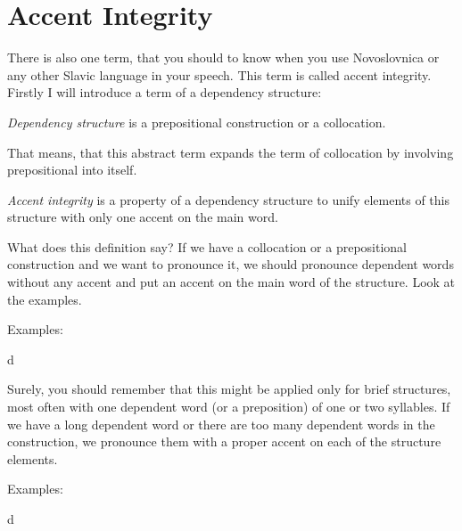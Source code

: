 \section{Accent Integrity}

There is also one term, that you should to know when you use Novoslovnica or any other Slavic language in your speech. This term is called accent integrity. Firstly I will introduce a term of a dependency structure:

\textit{Dependency structure} is a prepositional construction or a collocation.

That means, that this abstract term expands the term of collocation by involving prepositional into itself. 

\textit{Accent integrity} is a property of a dependency structure to unify elements of this structure with only one accent on the main word.

What does this definition say? If we have a collocation or a prepositional construction and we want to pronounce it, we should pronounce dependent words without any accent and put an accent on the main word of the structure. Look at the examples.

Examples:


d

Surely, you should remember that this might be applied only for brief structures, most often with one dependent word (or a preposition) of one or two syllables. If we have a long dependent word or there are too many dependent words in the construction, we pronounce them with a proper accent on each of the structure elements.

Examples:


d
